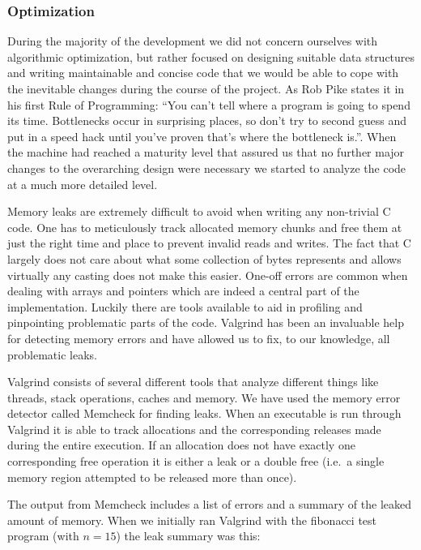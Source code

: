 \subsubsection{Optimization}

During the majority of the development we did not concern ourselves with
algorithmic optimization, but rather focused on designing suitable data
structures and writing maintainable and concise code that we would be able to
cope with the inevitable changes during the course of the project. As Rob Pike
states it in his first Rule of Programming: ``You can't tell where a program is
going to spend its time. Bottlenecks occur in surprising places, so don't try to
second guess and put in a speed hack until you've proven that's where the
bottleneck is.''\cite{pike-rules}. When the machine had reached a maturity level
that assured us that no further major changes to the overarching design were
necessary we started to analyze the code at a much more detailed level.

Memory leaks are extremely difficult to avoid when writing any non-trivial C
code. One has to meticulously track allocated memory chunks and free them at
just the right time and place to prevent invalid reads and writes. The fact that
C largely does not care about what some collection of bytes represents and
allows virtually any casting does not make this easier. One-off errors are
common when dealing with arrays and pointers which are indeed a central part of
the \thename{} implementation. Luckily there are tools available to aid in
profiling and pinpointing problematic parts of the code. Valgrind has been an
invaluable help for detecting memory errors and have allowed us to fix, to our
knowledge, all problematic leaks.

Valgrind consists of several different tools that analyze different things like
threads, stack operations, caches and memory. We have used the memory error
detector called Memcheck for finding leaks. When an executable is run through
Valgrind it is able to track allocations and the corresponding releases made
during the entire execution. If an allocation does not have exactly one
corresponding free operation it is either a leak or a double free (i.e.~a single
memory region attempted to be released more than once).

The output from Memcheck includes a list of errors and a summary of the leaked
amount of memory. When we initially ran Valgrind with the fibonacci test program
(with $n=15$) the leak summary was this:

